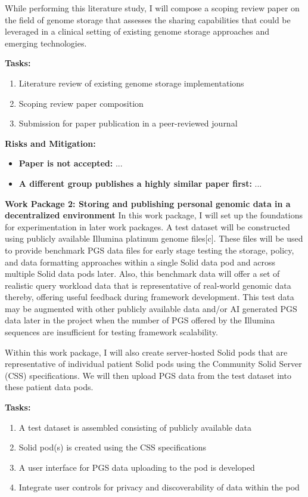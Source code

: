 \documentclass[11pt]{article}
\begin{document}
While performing this literature study, I will compose a scoping review paper on the field of genome storage that assesses the sharing capabilities that could be leveraged in a clinical setting of existing genome storage approaches and emerging technologies. 

\textbf{Tasks:} 
\begin{enumerate}
	\item Literature review of existing genome storage implementations
	\item Scoping review paper composition
	\item Submission for paper publication in a peer-reviewed journal
\end{enumerate}

\textbf{Risks and Mitigation:}  
\begin{itemize}
	\item \textbf{Paper is not accepted:} ... 
	\item \textbf{A different group publishes a highly similar paper first:} ...
\end{itemize}

\textbf{Work Package 2: Storing and publishing personal genomic data in a decentralized environment} 
In this work package, I will set up the foundations for experimentation in later work packages. 
A test dataset will be constructed using publicly available Illumina platinum genome files[c]. 
These files will be used to provide benchmark PGS data files for early stage testing the storage, policy, and data formatting approaches within a single Solid data pod and across multiple Solid data pods later. 
Also, this benchmark data will offer a set of realistic query workload data that is representative of real-world genomic data thereby, offering useful feedback during framework development. 
This test data may be augmented with other publicly available data and/or AI generated PGS data later in the project when the number of PGS offered by the Illumina sequences are insufficient for testing framework scalability.

Within this work package, I will also create server-hosted Solid pods that are representative of individual patient Solid pods using the Community Solid Server (CSS) specifications. 
We will then upload PGS data from the test dataset into these patient data pods. 

\textbf{Tasks:}  
\begin{enumerate}
	\item A test dataset is assembled consisting of publicly available data
	\item Solid pod(s) is created using the CSS specifications
	\item A user interface for PGS data uploading to the pod is developed
	\item Integrate user controls for privacy and discoverability of data within the pod
\end{enumerate}
\end{document}
